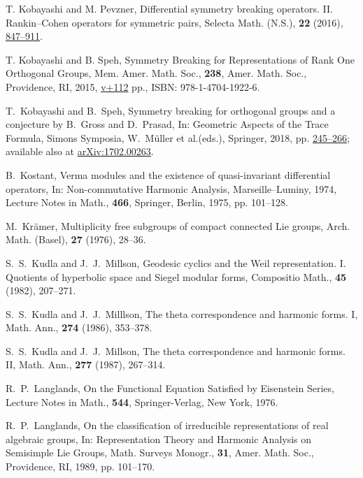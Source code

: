 \begin{thebibliography}{M}
T. Kobayashi and M. Pevzner,
Differential symmetry breaking operators. II.
Rankin--Cohen operators for symmetric pairs,
Selecta Math. (N.S.), {\bf{22}} (2016),
\href{http://dx.doi.org/10.1007/s00029-015-0208-8}
{847--911}.

T. Kobayashi and B. Speh,
Symmetry Breaking for Representations of Rank One Orthogonal Groups,
Mem. Amer. Math. Soc., {\bf{238}}, Amer. Math. Soc., Providence, RI,
2015,
\href{http://dx.doi.org/10.1090/memo/1126}
{v+112} pp., ISBN: 978-1-4704-1922-6.

T.~Kobayashi and B.~Speh,
Symmetry breaking for orthogonal groups and a conjecture by B.~Gross and D.~Prasad,
In: Geometric Aspects of the Trace Formula, Simons Symposia, 
W.~M{\"u}ller et al.(eds.), 
Springer, 2018, 
pp.
\href{https://doi.org/10.1007/978-3-319-94833-1_8}
{245--266};
available also at
\href{http://arxiv.org/abs/1702.00263}
{arXiv:1702.00263}.

B.~Kostant,
Verma modules and the existence of quasi-invariant differential operators,
In: Non-commutative Harmonic Analysis, Marseille--Luminy, 1974,
Lecture Notes in Math., {\bf 466}, Springer, Berlin, 1975, pp. 101--128.

M.~Kr{\"a}mer,
Multiplicity free subgroups of compact connected Lie groups,
Arch. Math. (Basel), {\bf{27}} (1976), 28--36.

S.~S.~Kudla and J.~J.~Millson,
Geodesic cyclics and the Weil representation. I.
Quotients of hyperbolic space and Siegel modular forms,
Compositio Math., {\bf{45}} (1982), 207--271.

S.~S.~Kudla and J.~J.~Milllson,
The theta correspondence and harmonic forms. I,
Math. Ann., {\bf{274}} (1986), 353--378.

S.~S.~Kudla and J.~J.~Millson,
The theta correspondence and harmonic forms. II,
Math. Ann., {\bf{277}} (1987), 267--314.

R.~P.~Langlands,
On the Functional Equation Satisfied by Eisenstein Series,
Lecture Notes in Math., {\bf{544}}, Springer-Verlag, New York, 1976.

R.~P.~Langlands,
On the classification of irreducible representations of real algebraic groups,
In: Representation Theory and Harmonic Analysis on Semisimple Lie Groups,
Math. Surveys Monogr., {\bf{31}}, Amer. Math. Soc., Providence, RI, 1989,
pp. 101--170.


\end{thebibliography}
